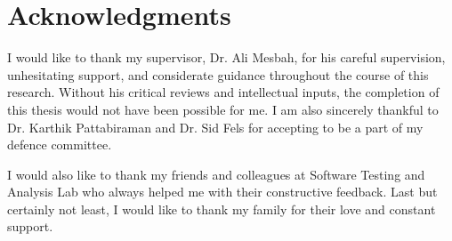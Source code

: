 
\chapter{Acknowledgments}

I would like to thank my supervisor, Dr. Ali Mesbah, for his careful supervision, unhesitating support, and considerate guidance throughout the course of this research. Without his critical reviews and intellectual inputs, the completion of this thesis would not have been possible for me. I am also sincerely thankful to Dr. Karthik Pattabiraman and Dr. Sid Fels for accepting to be a part of my defence committee. 

I would also like to thank my friends and colleagues at Software Testing and Analysis Lab who always helped me with their constructive feedback. Last but certainly not least, I would like to thank my family for their love and constant support.